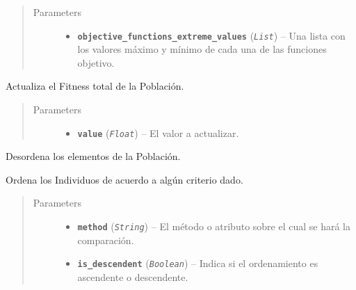 \documentclass[class=report, crop=false]{standalone}
\begin{document}
\begin{fulllineitems}
\begin{fulllineitems}
\begin{quote}\begin{description}
\item[{Parameters}] \leavevmode\begin{itemize}
\item \textbf{\texttt{objective\_functions\_extreme\_values}} (\emph{\texttt{List}}) -- Una lista con los valores máximo y mínimo
de cada una de las funciones objetivo.
\end{itemize}
\end{description}\end{quote}

\end{fulllineitems}

\begin{fulllineitems}

Actualiza el Fitness total de la Población.

\begin{quote}\begin{description}
\item[{Parameters}] \leavevmode\begin{itemize}
\item \textbf{\texttt{value}} (\emph{\texttt{Float}}) -- El valor a actualizar.
\end{itemize}
\end{description}\end{quote}

\end{fulllineitems}

\begin{fulllineitems}

Desordena los elementos de la Población.

\end{fulllineitems}

\begin{fulllineitems}

Ordena los Individuos de acuerdo a algún 
criterio dado.

\begin{quote}\begin{description}
\item[{Parameters}] \leavevmode\begin{itemize}
\item \textbf{\texttt{method}} (\emph{\texttt{String}}) -- El método o atributo sobre el cual se hará la comparación.
\item \textbf{\texttt{is\_descendent}} (\emph{\texttt{Boolean}}) -- Indica si el ordenamiento es ascendente o descendente.
\end{itemize}
\end{description}\end{quote}


\end{fulllineitems}
\end{fulllineitems}
\end{document}
